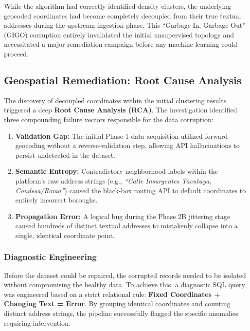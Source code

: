 While the algorithm had correctly identified density clusters, the underlying geocoded coordinates had become completely decoupled from their true textual addresses during the upstream ingestion phase. This ``Garbage In, Garbage Out'' (GIGO) corruption entirely invalidated the initial unsupervised topology and necessitated a major remediation campaign before any machine learning could proceed.


\subsection{Geospatial Remediation: Root Cause Analysis}
The discovery of decoupled coordinates within the initial clustering results triggered a deep \textbf{Root Cause Analysis (RCA)}. The investigation identified three compounding failure vectors responsible for the data corruption:

\begin{enumerate}[noitemsep, topsep=3pt]
    \item \textbf{Validation Gap:} The initial Phase 1 data acquisition utilized forward geocoding without a reverse-validation step, allowing API hallucinations to persist undetected in the dataset.
    \item \textbf{Semantic Entropy:} Contradictory neighborhood labels within the platform's raw address strings (e.g., \textit{``Calle Insurgentes Tacubaya, Condesa/Roma''}) caused the black-box routing API to default coordinates to entirely incorrect boroughs.
    \item \textbf{Propagation Error:} A logical bug during the Phase 2B jittering stage caused hundreds of distinct textual addresses to mistakenly collapse into a single, identical coordinate point.
\end{enumerate}

\subsubsection{Diagnostic Engineering}
Before the dataset could be repaired, the corrupted records needed to be isolated without compromising the healthy data. To achieve this, a diagnostic SQL query was engineered based on a strict relational rule: \textbf{Fixed Coordinates + Changing Text = Error}. By grouping identical coordinates and counting distinct address strings, the pipeline successfully flagged the specific anomalies requiring intervention.

